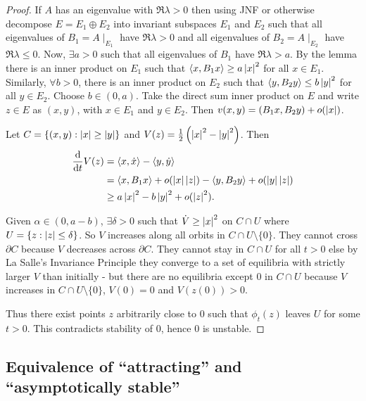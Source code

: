 \documentclass{notes}
\theoremstyle{plain}
\begin{document}
\begin{proof}
If $A$ has an eigenvalue with $\Re \lambda > 0$ then using JNF or otherwise
decompose $E = E_1 \oplus E_2$ into invariant subspaces $E_1$ and $E_2$ such
that all eigenvalues of $B_1 = A\mid_{E_1}$ have $\Re \lambda > 0$ and
all eigenvalues of $B_2 = A\mid_{E_2}$ have $\Re \lambda \le 0$.  Now,
$\exists a>0$ such that all eigenvalues of $B_1$ have $\Re \lambda > a$.
By the lemma there is an inner product on $E_1$ such that 
$\langle x, B_1 x \rangle \ge a \left|x\right|^2$ for all $x \in E_1$.  Similarly,
$\forall b > 0$, there is an inner product on $E_2$ such that 
$\langle y, B_2 y \rangle \le b \left|y\right|^2$ for all $y \in E_2$.  Choose
$b \in (0,a)$.  Take the direct sum inner product on $E$ and write $z \in E$
as $(x,y)$, with $x \in E_1$ and $y \in E_2$.  Then $v(x,y)
= (B_1 x, B_2 y) + o(\left|x\right|)$.

Let $C= \{(x,y) : \left|x\right| \ge \left|y\right| \}$
and $V(z) = \frac{1}{2}\left( \left|x\right|^2 - \left|y\right|^2 \right)$. Then
\begin{align*}
\frac{\mathrm{d}}{\mathrm{d} t}V(z) &= \langle x, \dot{x} \rangle - \langle y, \dot{y} \rangle \\
&= \langle x, B_1 x \rangle + o(\left|x\right|\left|z\right|)
- \langle y, B_2 y \rangle + o(\left|y\right|\left|z\right|) \\
& \ge a \left|x\right|^2 - b \left|y\right|^2 + o(\left|z\right|^2).
\end{align*}

Given $\alpha \in (0,a-b)$, $\exists \delta > 0$ such that $\dot{V} 
\ge \left|x\right|^2$ on $C \cap U$ where $U = \{ z : \left|z\right| \le \delta\}$.
So $V$ increases along all orbits in $C \cap U \setminus \{ 0 \}$.  They
cannot cross $\partial C$ because $V$ decreases across $\partial C$.  They
cannot stay in $C \cap U$ for all $t > 0$ else by La Salle's Invariance
Principle they converge to a set of equilibria with strictly larger $V$
than initially - but there are no equilibria except $0$ in $C \cap U$
because $V$ increases in $C \cap U \setminus \{ 0 \}$, $V(0) = 0$ and
$V(z(0)) > 0$.

Thus there exist points $z$ arbitrarily close to $0$ such that $\phi_t(z)$
leaves $U$ for some $t > 0$.  This contradicts stability of $0$, hence
$0$ is unstable.
\end{proof}

\subsection{Equivalence of ``attracting'' and ``asymptotically stable''}
\end{document}
